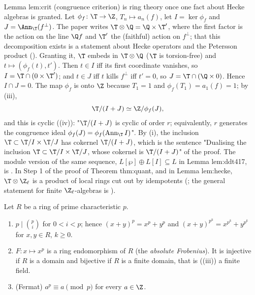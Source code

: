 \begin{paperlink}\label{pl:rings:crit}
Lemma lem:crit (congruence criterion) is ring theory once one fact about Hecke algebras is granted. Let
$\phi_f\colon\T\to\Z$, $T_n\mapsto a_n(f)$, let $I=\ker\phi_f$ and $J=\Ann_\T(f^\perp)$. The paper writes $\T\otimes\Q=\Q\times\T'$, where
the first factor is the action on the line $\Q f$ and $\T'$ the (faithful) action on $f^\perp$; that this decomposition exists is
a statement about Hecke operators and the Petersson product (). Granting it, $\T$ embeds in $\T\otimes\Q$
($\T$ is torsion-free) and $t\mapsto(\phi_f(t),t')$. Then $t\in I$ iff its first coordinate vanishes, so $I=\T\cap(0\times\T')$; and $t\in J$ iff
$t$ kills $f^\perp$ iff $t'=0$, so $J=\T\cap(\Q\times0)$. Hence $I\cap J=0$. The map $\phi_f$ is onto $\Z$ because $T_1=1$ and
$\phi_f(T_1)=a_1(f)=1$; by (iii),
\[
\T/(I+J)\simeq\Z/\phi_f(J),
\]
and this is cyclic ((iv)): "$\T/(I+J)$ is cyclic of order $r$; equivalently, $r$ generates the
congruence ideal $\phi_f(J)=\phi_f(\operatorname{Ann}_\T I)$". By (i), the inclusion $\T\subset\T/I\times\T/J$ has cokernel $\T/(I+J)$,
which is the sentence "Dualising the inclusion $\T\subset\T/I\times\T/J$, whose cokernel is $\T/(I+J)$" of the proof. The module
version of the same sequence, $L[\wp]\oplus L[I]\subseteq L$ in Lemma lem:ddt417, is . In Step 1 of the proof of
Theorem thm:quant, and in Lemma lem:hecke, $\T\otimes\Z_\ell$ is a product of local rings cut out by idempotents
(; the general statement for finite $\Z_\ell$-algebras is ).
\end{paperlink}

\begin{proposition}\label{prop:rings:freshman}
Let $R$ be a ring of prime characteristic $p$.
\begin{enumerate}[label=(\roman*)]
\item $p\mid\binom pi$ for $0<i<p$; hence $(x+y)^p=x^p+y^p$ and $(x+y)^{p^k}=x^{p^k}+y^{p^k}$ for $x,y\in R$, $k\ge0$.
\item $F\colon x\mapsto x^p$ is a ring endomorphism of $R$ (the \emph{absolute Frobenius}). It is injective if $R$ is a domain and
bijective if $R$ is a finite domain, that is ((iii)) a finite field.
\item (Fermat) $a^p\equiv a\pmod p$ for every $a\in\Z$.
\end{enumerate}
\end{proposition}

